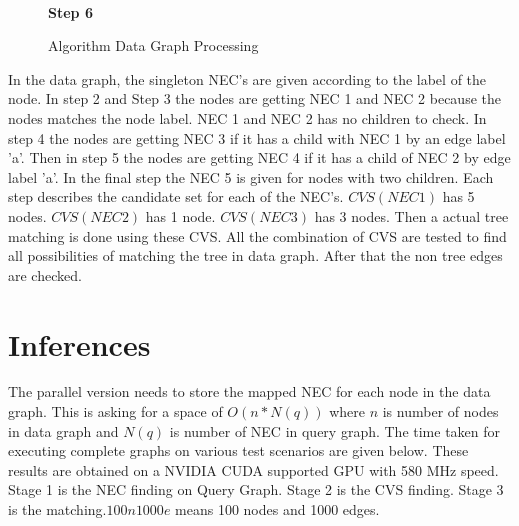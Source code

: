 \begin{figure}[h!]
\begin{minipage}{.4\textwidth}
\\\textbf{Step 6}
\end{minipage}
\caption{Algorithm Data Graph Processing}
 \label{fig:workingdg}
\end{figure}
\par In the data graph, the singleton NEC's are given according to the label of the node. In step 2 and Step 3 the nodes are getting NEC 1 and NEC 2 because the nodes matches the node label. NEC 1 and NEC 2 has no children to check. In step 4 the nodes are getting NEC 3 if it has a child with NEC 1 by an edge label 'a'. Then in step 5 the nodes are getting NEC 4 if it has a child of NEC 2 by edge label 'a'. In the final step the NEC 5 is given for nodes with two children. Each step describes the candidate set for each of the NEC's. $CVS(NEC 1)$ has 5 nodes. $CVS(NEC 2)$ has 1 node. $CVS(NEC 3)$ has 3 nodes. Then a actual tree matching is done using these CVS. All the combination of CVS are tested to find all possibilities of matching the tree in data graph. After that the non tree edges are checked.
\section{Inferences}
\hspace{10mm}The parallel version needs to store the mapped NEC for each node in the data graph. This is asking for a space of $O(n*N(q))$ where $n$ is number of nodes in data graph and $N(q)$ is number of  NEC in query graph. The time taken for executing complete graphs on various test scenarios are given below. These results are obtained on a NVIDIA CUDA supported GPU with 580 MHz speed. Stage 1 is the NEC finding on Query Graph. Stage 2 is the CVS finding. Stage 3 is the matching.$100n1000e$ means 100 nodes and 1000 edges. 

